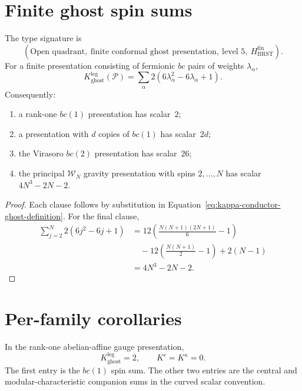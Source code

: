 \section{Finite ghost spin sums}
\label{sec:platonic-conductor}

\begin{theorem}
\label{thm:platonic-conductor}
\ClaimStatusProvedHere
The type signature is
\[
 (\text{Open quadrant},\ \text{finite conformal ghost presentation},\
 \text{level }5,\ H_{\mathrm{BRST}}^{\mathrm{fin}}).
\]
For a finite presentation consisting of fermionic $bc$ pairs of
weights $\lambda_\alpha$,
\[
 K_{\mathrm{ghost}}^{\mathrm{leg}}(\mathcal P)
 =\sum_\alpha2(6\lambda_\alpha^2-6\lambda_\alpha+1).
\]
Consequently:
\begin{enumerate}
\item a rank-one $bc(1)$ presentation has scalar~$2$;
\item a presentation with $d$ copies of $bc(1)$ has scalar~$2d$;
\item the Virasoro $bc(2)$ presentation has scalar~$26$;
\item the principal $\mathcal W_N$ gravity presentation with spins
$2,\ldots,N$ has scalar $4N^3-2N-2$.
\end{enumerate}
\end{theorem}

\begin{proof}
Each clause follows by substitution in
Equation~\eqref{eq:kappa-conductor-ghost-definition}.  For the final
clause,
\begin{align*}
\sum_{j=2}^{N}2(6j^2-6j+1)
&=12\left(\frac{N(N+1)(2N+1)}6-1\right)\\
&\quad-12\left(\frac{N(N+1)}2-1\right)+2(N-1)\\
&=4N^3-2N-2.
\end{align*}
\end{proof}

\section{Per-family corollaries}
\label{sec:conductor-corollaries}

\begin{corollary}[Heisenberg]
\label{cor:K-heisenberg}
In the rank-one abelian-affine gauge presentation,
\[
K_{\mathrm{ghost}}^{\mathrm{leg}}=2,
\qquad K^c=K^\kappa=0.
\]
The first entry is the $bc(1)$ spin sum.  The other two entries are the
central and modular-characteristic companion sums in the curved scalar
convention.
\end{corollary}

